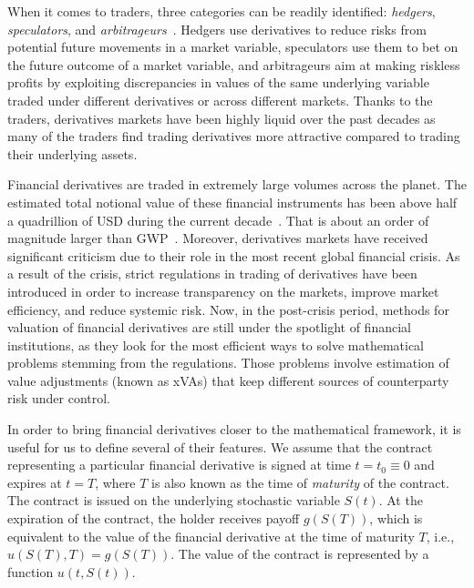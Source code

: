 \documentclass{UUThesisTemplate}
\begin{document}
\par
When it comes to traders, three categories can be readily identified: \emph{hedgers}, \emph{speculators}, and \emph{arbitrageurs}~\cite{hull2017options}. Hedgers use derivatives to reduce risks from potential future movements in a market variable, speculators use them to bet on the future outcome of a market variable, and arbitrageurs aim at making riskless profits by exploiting discrepancies in values of the same underlying variable traded under different derivatives or across different markets. Thanks to the traders, derivatives markets have been highly liquid over the past decades as many of the traders find trading derivatives more attractive compared to trading their underlying assets.

\par
Financial derivatives are traded in extremely large volumes across the planet. %
The estimated total notional value of these financial instruments has been above half a quadrillion of USD during the current decade~\cite{bank2018annual}. That is about an order of magnitude larger than GWP~\cite{worldgdp2018annual}. Moreover, derivatives markets have received significant criticism due to their role in the most recent global financial crisis.  As a result of the crisis, strict regulations in trading of derivatives have been introduced in order to increase transparency on the markets, improve market efficiency, and reduce systemic risk. Now, in the post-crisis period, methods for valuation of financial derivatives are still under the spotlight of financial institutions, as they look for the most efficient ways to solve mathematical problems stemming from the regulations. Those problems involve estimation of value adjustments (known as xVAs) that keep different sources of counterparty risk under control. 

\par
In order to bring financial derivatives closer to the mathematical framework, it is useful for us to define several of their features. We assume that the contract representing a particular financial derivative is signed at time $t=t_0\equiv0$ and expires at $t=T$, where $T$ is also known as the time of \emph{maturity} of the contract. The contract is issued on the underlying stochastic variable $S(t)$. At the expiration of the contract, the holder receives payoff $g(S(T))$, which is equivalent to the value of the financial derivative at the time of maturity $T$, i.e., $u(S(T),T) = g(S(T))$. The value of the contract is represented by a function $u(t,S(t))$.
\end{document}

